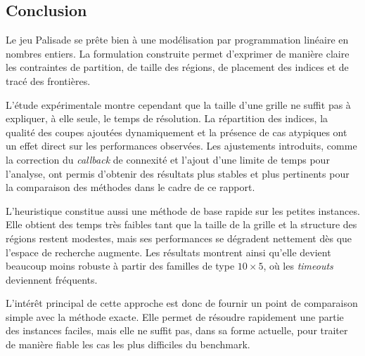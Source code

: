 \subsection{Conclusion}

Le jeu Palisade se prête bien à une modélisation par
programmation linéaire en nombres entiers. La formulation construite permet
d'exprimer de manière claire les contraintes de partition, de taille des
régions, de placement des indices et de tracé des frontières.

L'étude expérimentale montre cependant que la taille d'une grille ne suffit pas
à expliquer, à elle seule, le temps de résolution. La répartition des indices,
la qualité des coupes ajoutées dynamiquement et la présence de cas atypiques ont
un effet direct sur les performances observées. Les ajustements introduits,
comme la correction du \textit{callback} de connexité et l'ajout d'une limite de
temps pour l'analyse, ont permis d'obtenir des résultats plus stables et plus
pertinents pour la comparaison des méthodes dans le cadre de ce rapport.

L'heuristique constitue aussi une méthode
de base rapide sur les petites instances. Elle obtient des temps très faibles
tant que la taille de la grille et la structure des régions restent modestes,
mais ses performances se dégradent nettement dès que l'espace de recherche
augmente. Les résultats montrent ainsi qu'elle devient beaucoup moins robuste à
partir des familles de type \(10 \times 5\), où les \textit{timeouts}
deviennent fréquents.

L'intérêt principal de cette approche est donc de fournir un point de
comparaison simple avec la méthode exacte. Elle permet de résoudre rapidement
une partie des instances faciles, mais elle ne suffit pas, dans sa forme
actuelle, pour traiter de manière fiable les cas les plus difficiles du
benchmark.
